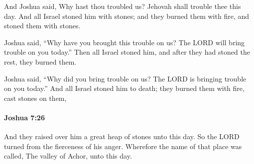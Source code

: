 			\begin{versebox}
					\item[BHS] 
					\item[ASV] And Joshua said, Why hast thou troubled us? Jehovah shall trouble thee this day. And all Israel stoned him with stones; and they burned them with fire, and stoned them with stones.
					\item[NIV] Joshua said, “Why have you brought this trouble on us? The LORD will bring trouble on you today.” Then all Israel stoned him, and after they had stoned the rest, they burned them.
					\item[NRSV] Joshua said, “Why did you bring trouble on us? The LORD is bringing trouble on you today.” And all Israel stoned him to death; they burned them with fire, cast stones on them,
			\end{versebox}

		\paragraph{Joshua 7:26} %
			\label{JOSHUA-7-26}

			And they raised over him a great heap of stones unto this day. So the LORD turned from the fierceness of his anger. Wherefore the name of that place was called, The valley of Achor, unto this day.

